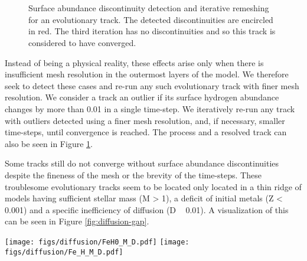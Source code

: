 \documentclass[manuscript]{aastex}
\begin{document}
\begin{figure}
    \centering
    \\
    \\
    \caption{Surface abundance discontinuity detection and iterative remeshing for an evolutionary track. The detected discontinuities are encircled in red. The third iteration has no discontinuities and so this track is considered to have converged. }
    \label{fig:discontinuity}
\end{figure}

Instead of being a physical reality, these effects arise only when there is insufficient mesh resolution in the outermost layers of the model. We therefore seek to detect these cases and re-run any such evolutionary track with finer mesh resolution. We consider a track an outlier if its surface hydrogen abundance changes by more than 0.01 in a single time-step. We iteratively re-run any track with outliers detected using a finer mesh resolution, and, if necessary, smaller time-steps, until convergence is reached. The process and a resolved track can also be seen in Figure \ref{fig:discontinuity}. 

Some tracks still do not converge without surface abundance discontinuities despite the fineness of the mesh or the brevity of the time-steps. These troublesome evolutionary tracks seem to be located only located in a thin ridge of models having sufficient stellar mass (M > 1), a deficit of initial metals (Z < 0.001) and a specific inefficiency of diffusion (D ~ 0.01). A visualization of this can be seen in Figure \ref{fig:diffusion-gap}.

\begin{figure*}
    \centering
    \texttt{[image: figs/diffusion/FeH0\_M\_D.pdf]}\hfill
    \texttt{[image: figs/diffusion/Fe\_H\_M\_D.pdf]}
    \caption{Stellar mass as a function of diffusion factor colored by initial surface metallicity (left) and final surface metallicity (right). A ridge of unconverged evolutionary tracks can be seen around a diffusion factor of 0.01. Beyond this ridge, tracks that were initially metal-poor end their main-sequence lives with all of their metals drained from their surfaces. } 
    \label{fig:diffusion-gap}
\end{figure*}
\end{document}
